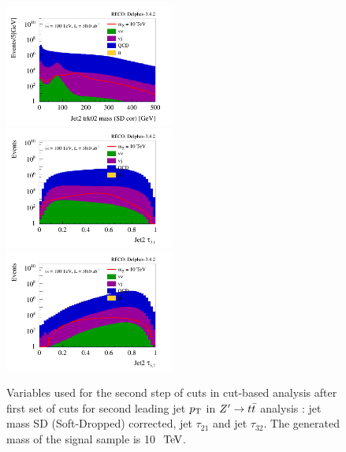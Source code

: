 \documentclass{cernrep}
\begin{document}
\begin{figure}[!htb]\centering
\includegraphics[width=0.495\textwidth]{Fig/Zptt/cut/Jet2_trk02_SD_Cor_m_sel0_nostack_log.png}
\includegraphics[width=0.495\textwidth]{Fig/Zptt/cut/Jet2_tau21_sel0_nostack_log.png}
\includegraphics[width=0.495\textwidth]{Fig/Zptt/cut/Jet2_tau32_sel0_nostack_log.png}
\caption{Variables used for the second step of cuts in cut-based analysis after first set of cuts for second leading jet $p\sb{\scriptstyle\mathrm{T}}$ in $Z^{\prime} \rightarrow t\bar{t}$ analysis : jet mass SD (Soft-Dropped) corrected, jet $\tau_{21}$ and jet $\tau_{32}$. The generated mass of the signal sample is 10 $\TeV$.}
\label{fig:Zptt_sel1_cut}
\end{figure}
\end{document}
